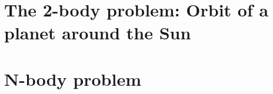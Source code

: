 \documentclass[11 pt]{article}
\begin{document}
    \section{The 2-body problem: Orbit of a planet around the Sun}
        

    \section{N-body problem}
        
\end{document}
